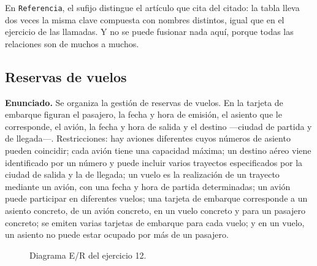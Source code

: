 En \texttt{Referencia}, el sufijo distingue el artículo que cita del citado: la
tabla lleva dos veces la misma clave compuesta con nombres distintos, igual que
en el ejercicio de las llamadas. Y no se puede fusionar nada aquí, porque todas
las relaciones son de muchos a muchos.

\subsection{Reservas de vuelos}

\textbf{Enunciado.} Se organiza la gestión de reservas de vuelos. En la tarjeta
de embarque figuran el pasajero, la fecha y hora de emisión, el asiento que le
corresponde, el avión, la fecha y hora de salida y el destino —ciudad de partida
y de llegada—. Restricciones: hay aviones diferentes cuyos números de asiento
pueden coincidir; cada avión tiene una capacidad máxima; un destino aéreo viene
identificado por un número y puede incluir varios trayectos especificados por la
ciudad de salida y la de llegada; un vuelo es la realización de un trayecto
mediante un avión, con una fecha y hora de partida determinadas; un avión puede
participar en diferentes vuelos; una tarjeta de embarque corresponde a un
asiento concreto, de un avión concreto, en un vuelo concreto y para un pasajero
concreto; se emiten varias tarjetas de embarque para cada vuelo; y en un vuelo,
un asiento no puede estar ocupado por más de un pasajero.

\begin{figure}[H]
\centering
{}
\caption{Diagrama E/R del ejercicio 12.}
\end{figure}

